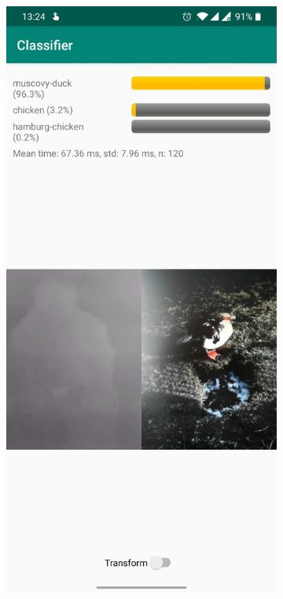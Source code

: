 \documentclass{l4proj}
\begin{document}
\begin{figure}[ht]
  \centering
  \begin{subfigure}[h!]{0.3\textwidth}
    \includegraphics[width=\textwidth]{images/app/screenshot_0.jpg}

\end{subfigure}
\end{figure}
\end{document}
